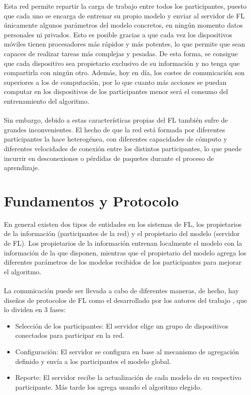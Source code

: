 Esta red permite repartir la carga de trabajo entre todos los participantes, puesto que cada uno se encarga de entrenar su propio modelo y enviar al servidor de FL únicamente algunos parámetros del modelo concretos, en ningún momento datos personales ni privados. Esto es posible gracias a que cada vez los dispositivos móviles tienen procesadores más rápidos y más potentes, lo que permite que sean capaces de realizar tareas más complejas y pesadas. De esta forma, se consigue que cada dispositivo sea propietario exclusivo de su información y no tenga que compartirla con ningún otro. Además, hoy en día, los costes de comunicación son superiores a los de computación, por lo que cuanto más acciones se puedan computar en los dispositivos de los participantes menor será el consumo del entrenamiento del algoritmo. 
\\ \\
Sin embargo, debido a estas características propias del FL también sufre de grandes inconvenientes. El hecho de que la red está formada por diferentes participantes la hace heterogénea, con diferentes capacidades de cómputo y diferentes velocidades de conexión entre los distintos participantes, lo que puede incurrir en desconexiones o pérdidas de paquetes durante el proceso de aprendizaje.

\section{Fundamentos y Protocolo}
En general existen dos tipos de entidades en los sistemas de FL, los propietarios de la información (participantes de la red) y el propietario del modelo (servidor de FL). Los propietarios de la información entrenan localmente el modelo con la información de la que disponen, mientras que el propietario del modelo agrega los diferentes parámetros de los modelos recibidos de los participantes para mejorar el algoritmo. 
\\ \\
La comunicación puede ser llevada a cabo de diferentes maneras, de hecho, hay diseños de protocolos de FL como el desarrollado por los autores del trabajo \autocite{bonawitzFederatedLearningScale2019}, que lo dividen en 3 fases:

\begin{itemize}
    \item Selección de los participantes: El servidor elige un grupo de dispositivos conectados para participar en la red.
    \item Configuración: El servidor se configura en base al mecanismo de agregación definido y envía a los participantes el modelo global.
    \item Reporte: El servidor recibe la actualización de cada modelo de su respectivo participante. Más tarde los agrega usando el algoritmo elegido.
\end{itemize}

